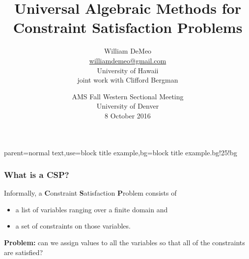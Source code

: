 \documentclass[10pt,xcolor=dvipsnames%
   ]{beamer}
\DeclareMathOperator{\Rel}{Rel}
\renewcommand{\.}{\cdot}
\newcommand{\sP}{\ensuremath{\mathcal{P}}}
\begin{document}
\title[Algebraic CSP]{Universal Algebraic Methods for \\Constraint Satisfaction Problems}
\author[\url{williamdemeo@gmail.com}]{William DeMeo\\
  {\small \url{williamdemeo@gmail.com}}\\[5pt]
  {\small University of Hawaii}\\[10pt]
  {\small joint work with Clifford Bergman}
}

\date[8 Oct 2016]{AMS Fall Western Sectional Meeting\\[10pt]
University of Denver\\[10pt]
8 October 2016}

\frame[plain]{\titlepage}

%
{parent=normal text,use=block title example,bg=block title example.bg!25!bg}

\begin{frame}
\frametitle{What is a CSP?}

  Informally, a \textbf{C}onstraint \textbf Satisfaction \textbf Problem
  consists of
  \begin{itemize}
  \item a list of variables ranging over a finite domain and
  \item a set of constraints on those variables.
  \end{itemize}

  \textbf{Problem:} can we assign values to all the variables so that
  all of the constraints are satisfied?

\end{frame}







\end{document}

